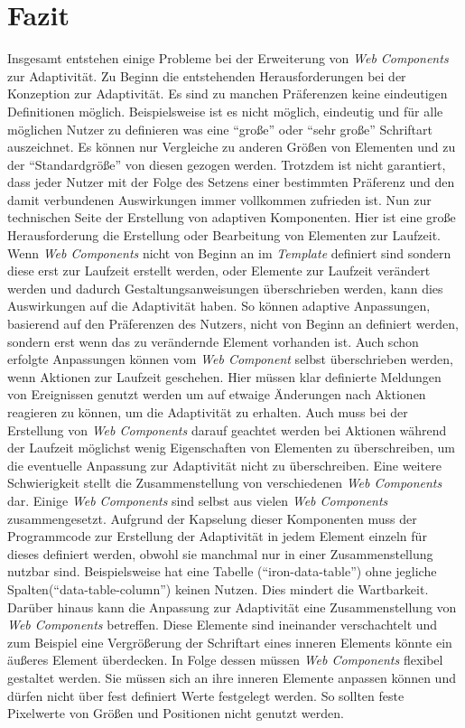\documentclass[12pt, paper=a4, bibtotoc, toc=listof, headsepline=true]{scrreprt}
\begin{document}
\chapter{Fazit}
Insgesamt entstehen einige Probleme bei der Erweiterung von \emph{Web Components} zur Adaptivität.
Zu Beginn die entstehenden Herausforderungen bei der Konzeption zur Adaptivität. Es sind zu manchen Präferenzen keine eindeutigen Definitionen möglich. Beispielsweise ist es nicht möglich, eindeutig und für alle möglichen Nutzer zu definieren was eine \enquote{große} oder \enquote{sehr große} Schriftart auszeichnet. Es können nur Vergleiche zu anderen Größen von Elementen und zu der \enquote{Standardgröße} von diesen gezogen werden. Trotzdem ist nicht garantiert, dass jeder Nutzer mit der Folge des Setzens einer bestimmten Präferenz und den damit verbundenen Auswirkungen immer vollkommen zufrieden ist.
\newline
Nun zur technischen Seite der Erstellung von adaptiven Komponenten. Hier ist eine große Herausforderung die Erstellung oder Bearbeitung von Elementen zur Laufzeit. Wenn \emph{Web Components} nicht von Beginn an im \emph{Template} definiert sind sondern diese erst zur Laufzeit erstellt werden, oder Elemente zur Laufzeit verändert werden und dadurch Gestaltungsanweisungen überschrieben werden, kann dies Auswirkungen auf die Adaptivität haben. So können adaptive Anpassungen, basierend auf den Präferenzen des Nutzers, nicht von Beginn an definiert werden, sondern erst wenn das zu verändernde Element vorhanden ist. Auch schon erfolgte Anpassungen können vom \emph{Web Component} selbst überschrieben werden, wenn Aktionen zur Laufzeit geschehen. Hier müssen klar definierte Meldungen von Ereignissen genutzt werden um auf etwaige Änderungen nach Aktionen reagieren zu können, um die Adaptivität zu erhalten. Auch muss bei der Erstellung von \emph{Web Components} darauf geachtet werden bei Aktionen während der Laufzeit möglichst wenig Eigenschaften von Elementen zu überschreiben, um die eventuelle Anpassung zur Adaptivität nicht zu überschreiben. Eine weitere Schwierigkeit stellt die Zusammenstellung von verschiedenen \emph{Web Components} dar. Einige \emph{Web Components} sind selbst aus vielen \emph{Web Components} zusammengesetzt. Aufgrund der Kapselung dieser Komponenten muss der Programmcode zur Erstellung der Adaptivität in jedem Element einzeln für dieses definiert werden, obwohl sie manchmal nur in einer Zusammenstellung nutzbar sind. Beispielsweise hat eine Tabelle (\enquote{iron-data-table}) ohne jegliche Spalten(\enquote{data-table-column}) keinen Nutzen. Dies mindert die Wartbarkeit. Darüber hinaus kann die Anpassung zur Adaptivität eine Zusammenstellung von \emph{Web Components} betreffen. Diese Elemente sind ineinander verschachtelt und zum Beispiel eine Vergrößerung der Schriftart eines inneren Elements könnte ein äußeres Element überdecken. In Folge dessen müssen \emph{Web Components} flexibel gestaltet werden. Sie müssen sich an ihre inneren Elemente anpassen können und dürfen nicht über fest definiert Werte festgelegt werden. So sollten feste Pixelwerte von Größen und Positionen nicht genutzt werden.
\end{document}
